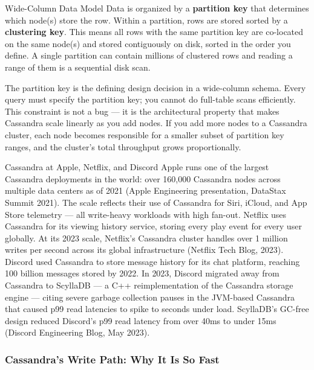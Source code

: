 \documentclass[11pt,a4paper]{article}
\begin{document}
\begin{termbox}{Wide-Column Data Model}
Data is organized by a \textbf{partition key} that determines which node(s) store the row. Within a partition, rows are stored sorted by a \textbf{clustering key}. This means all rows with the same partition key are co-located on the same node(s) and stored contiguously on disk, sorted in the order you define. A single partition can contain millions of clustered rows and reading a range of them is a sequential disk scan.
\end{termbox}

The partition key is the defining design decision in a wide-column schema. Every query must specify the partition key; you cannot do full-table scans efficiently. This constraint is not a bug --- it is the architectural property that makes Cassandra scale linearly as you add nodes. If you add more nodes to a Cassandra cluster, each node becomes responsible for a smaller subset of partition key ranges, and the cluster's total throughput grows proportionally.

\begin{industrybox}{Cassandra at Apple, Netflix, and Discord}
Apple runs one of the largest Cassandra deployments in the world: over 160,000 Cassandra nodes across multiple data centers as of 2021 (Apple Engineering presentation, DataStax Summit 2021). The scale reflects their use of Cassandra for Siri, iCloud, and App Store telemetry --- all write-heavy workloads with high fan-out. Netflix uses Cassandra for its viewing history service, storing every play event for every user globally. At its 2023 scale, Netflix's Cassandra cluster handles over 1 million writes per second across its global infrastructure (Netflix Tech Blog, 2023). Discord used Cassandra to store message history for its chat platform, reaching 100 billion messages stored by 2022. In 2023, Discord migrated away from Cassandra to ScyllaDB --- a C++ reimplementation of the Cassandra storage engine --- citing severe garbage collection pauses in the JVM-based Cassandra that caused p99 read latencies to spike to seconds under load. ScyllaDB's GC-free design reduced Discord's p99 read latency from over 40ms to under 15ms (Discord Engineering Blog, May 2023).
\end{industrybox}

\subsubsection{Cassandra's Write Path: Why It Is So Fast}
\end{document}
